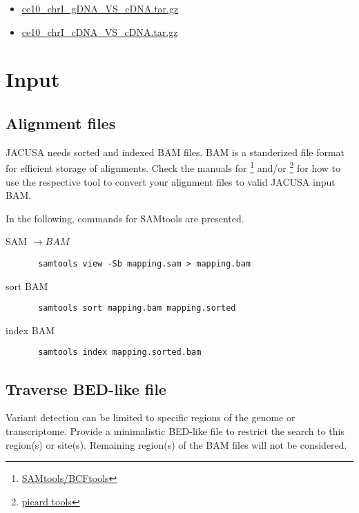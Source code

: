 \documentclass[12pt, a4paper]{article}
\begin{document}
\begin{itemize}
  \item 
  \href{http://www.age.mpg.com/software/jacusa/sample_data/ce10_chrI_gDNA_VS_cDNA.tar.gz}{ce10\_chrI\_gDNA\_VS\_cDNA.tar.gz}
  \item 
  \href{http://www.age.mpg.com/software/jacusa/sample_data/ce10_chrI_cDNA_VS_cDNA.tar.gz}{ce10\_chrI\_cDNA\_VS\_cDNA.tar.gz}
\end{itemize}
\section{Input}
\subsection{Alignment files}
JACUSA needs sorted and indexed BAM files. BAM is a standerized file format for
efficient storage of alignments. Check the manuals for
\footnote{\href{http://samtools.sourceforge.net/}{SAMtools/BCFtools}} and/or
\footnote{\href{http://broadinstitute.github.io/picard/}{picard tools}} for how to use the
respective tool to convert your alignment files to valid JACUSA input BAM.

In the following, commands for SAMtools are presented.
\begin{description}
\item[SAM $\rightarrow BAM$] \begin{verbatim} samtools view -Sb mapping.sam > mapping.bam \end{verbatim}
\item[sort BAM] \begin{verbatim} samtools sort mapping.bam mapping.sorted \end{verbatim} 
\item[index BAM] \begin{verbatim} samtools index mapping.sorted.bam \end{verbatim}
\end{description}
\subsection{Traverse BED-like file}
Variant detection can be limited to specific regions of the genome or transcriptome.  Provide a
minimalistic BED-like file to restrict the search to this region(s) or site(s). Remaining region(s)
of the BAM files will not be considered.
\end{document}

